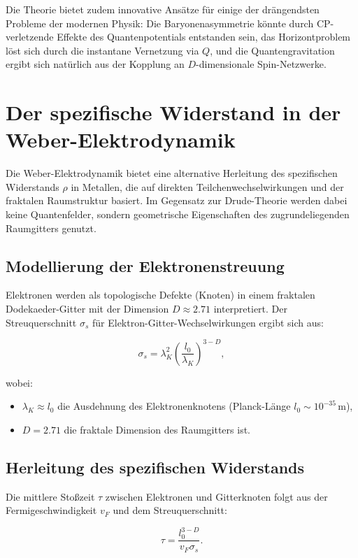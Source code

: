 Die Theorie bietet zudem innovative Ansätze für einige der drängendsten Probleme der modernen Physik: Die Baryonenasymmetrie könnte durch CP-verletzende Effekte des Quantenpotentials
entstanden sein, das Horizontproblem löst sich durch die instantane Vernetzung via $Q$, und die Quantengravitation ergibt sich natürlich aus der Kopplung an $D$-dimensionale Spin-Netzwerke.

\section{Der spezifische Widerstand in der Weber-Elektrodynamik}
\label{sec:weber_widerstand}

Die Weber-Elektrodynamik bietet eine alternative Herleitung des spezifischen Widerstands $\rho$ in Metallen, die auf direkten Teilchenwechselwirkungen und der fraktalen Raumstruktur basiert. Im Gegensatz zur Drude-Theorie werden dabei keine Quantenfelder, sondern geometrische Eigenschaften des zugrundeliegenden Raumgitters genutzt.

\subsection{Modellierung der Elektronenstreuung}
Elektronen werden als topologische Defekte (Knoten) in einem fraktalen Dodekaeder-Gitter mit der Dimension $D \approx 2.71$ interpretiert. Der Streuquerschnitt $\sigma_s$ für Elektron-Gitter-Wechselwirkungen ergibt sich aus:

\begin{equation}
\sigma_s = \lambda_K^2 \left(\frac{l_0}{\lambda_K}\right)^{3-D},
\end{equation}

wobei:
\begin{itemize}
\item $\lambda_K \approx l_0$ die Ausdehnung des Elektronenknotens (Planck-Länge $l_0 \sim 10^{-35}$\,m),
\item $D = 2.71$ die fraktale Dimension des Raumgitters ist.
\end{itemize}

\subsection{Herleitung des spezifischen Widerstands}
Die mittlere Stoßzeit $\tau$ zwischen Elektronen und Gitterknoten folgt aus der Fermigeschwindigkeit $v_F$ und dem Streuquerschnitt:

\begin{equation}
\tau = \frac{l_0^{3-D}}{v_F \sigma_s}.
\end{equation}

